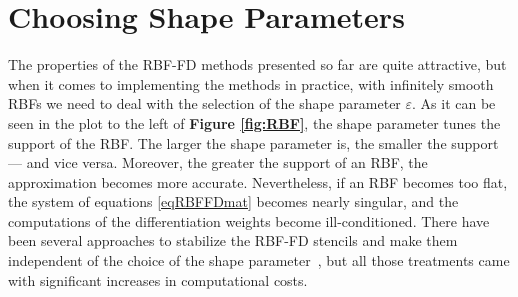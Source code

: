 \documentclass{UUThesisTemplate}
\begin{document}
%
\section{Choosing Shape Parameters}
The properties of the RBF-FD methods presented so far are quite attractive, but when it comes to implementing the methods in practice, with infinitely smooth RBFs we need to deal with the selection of the shape parameter $\varepsilon$. As it can be seen in the plot to the left of \textbf{Figure \ref{fig:RBF}}, the shape parameter tunes the support of the RBF. The larger the shape parameter is, the smaller the support --- and vice versa. Moreover, the greater the support of an RBF, the approximation becomes more accurate. Nevertheless, if an RBF becomes too flat, the system of equations \eqref{eqRBFFDmat} becomes nearly singular, and the computations of the differentiation weights become ill-conditioned. There have been several approaches to stabilize the RBF-FD stencils and make them independent of the choice of the shape parameter~\cite{larsson2013stable, fornberg2013stable}, but all those treatments came with significant increases in computational costs.  
\end{document}
